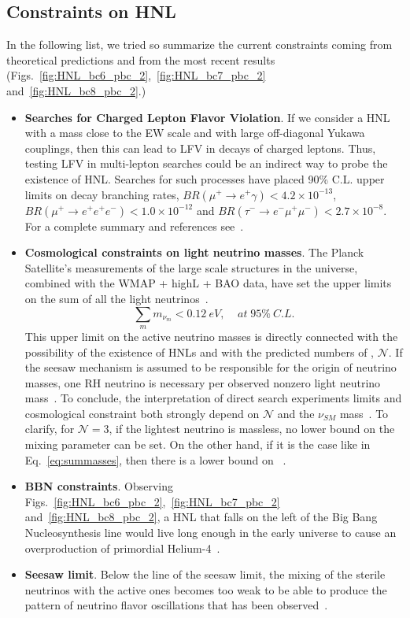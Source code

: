 \subsection{Constraints on HNL}
In the following list, we tried so summarize the current constraints
coming from theoretical predictions and from the most recent results (Figs.~\ref{fig:HNL_bc6_pbc_2},~\ref{fig:HNL_bc7_pbc_2}
and~\ref{fig:HNL_bc8_pbc_2}.)
\begin{itemize}
\item \textbf{Searches for Charged Lepton Flavor Violation}. If we consider a HNL with a
  mass close to the EW scale and with large off-diagonal Yukawa couplings,
  then this can lead to LFV in decays of charged leptons. Thus,
  testing LFV in multi-lepton searches could be an indirect way to
  probe the existence of HNL. Searches for such processes have
  placed 90\% C.L. upper limits on decay branching rates, \ie
  $BR(\mu^+\rightarrow e^+\gamma) < 4.2\times 10^{-13}$,
  $BR(\mu^+\rightarrow e^+e^+e^-) < 1.0\times 10^{-12}$ and
  $BR(\tau^-\rightarrow e^-\mu^+\mu^-) < 2.7\times 10^{-8}$. For a 
  complete summary and references see~\cite{Pascoli_2019}.
\item \textbf{Cosmological constraints on light neutrino masses}. The Planck
  Satellite's measurements of the large scale structures in the
  universe, combined with the WMAP + highL + BAO data, have set the
  upper limits on the sum of all the light
  neutrinos~\cite{Aghanim:2018eyx}.
\begin{equation}
\label{eq:summasses}
\sum_{m} m_{\nu_m} < 0.12 \: eV, \;\;\;\; at \;95\% \: C.L.
\end{equation}
This upper limit on the active neutrino masses is directly connected
with the possibility of the existence of HNLs and with the predicted
numbers of \hnl, $\mathcal{N}$.
If the seesaw mechanism is assumed to be responsible for the origin of neutrino masses,
one RH neutrino is necessary per observed nonzero light
neutrino mass~\cite{Alekhin_2016}.
To conclude, the interpretation of direct search experiments limits and cosmological constraint both strongly
depend on $\mathcal{N}$ and the $\nu_{SM}$
mass~\cite{DREWES2017250,drewes2015theoretical}. To clarify, for
$\mathcal{N}=3$, if the lightest neutrino is massless, no
lower bound on the mixing parameter \mixpar can be set.
On the other hand, if it is the case like in Eq.~\ref{eq:summasses}, then there is a lower
bound on \mixpar~\cite{DREWES2017250}.
\item \textbf{BBN constraints}. Observing
  Figs.~\ref{fig:HNL_bc6_pbc_2},~\ref{fig:HNL_bc7_pbc_2}
  and~\ref{fig:HNL_bc8_pbc_2}, a HNL that falls on the left of the
  Big Bang Nucleosynthesis line would live long enough in
  the early universe to cause an overproduction of primordial
  Helium-4~\cite{Ruchayskiy_2012}.
\item \textbf{Seesaw limit}. Below the line of the seesaw limit, the
  mixing of the sterile neutrinos with the active ones becomes too
  weak to be able to produce the pattern of neutrino flavor oscillations that has been observed~\cite{Canetti_2010}. 
\end{itemize}
\clearpage
